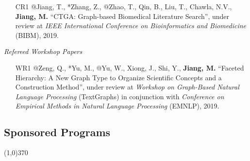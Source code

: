 \documentclass[10pt]{article}
\newenvironment{myindentpar}[1]%
{\begin{list}{}%
         {\setlength{\leftmargin}{#1}}%
         \item[]%
}
{\end{list}}
\newcounter{list}
\begin{document}
\begin{myindentpar}{0.00cm}
\begin{enumerate}[leftmargin=.5cm]
\item[CR1] @Jiang, T., *Zhang, Z., @Zhao, T., Qin, B., Liu, T., Chawla, N.V., \textbf{Jiang, M.} ``CTGA: Graph-based Biomedical Literature Search'', under review at \textit{IEEE International Conference on Bioinformatics and Biomedicine} (BIBM), 2019.

\end{enumerate}

\vspace{.2cm}\hspace{-0.25cm}\emph{Refereed Workshop Papers}

\begin{enumerate}[leftmargin=.5cm]
	
\item[WR1] @Zeng, Q., *Yu, M., @Yu, W., Xiong, J., Shi, Y., \textbf{Jiang, M.} ``Faceted Hierarchy: A New Graph Type to Organize Scientific Concepts and a Construction Method'', under review at \textit{Workshop on Graph-Based Natural Language Processing} (TextGraphs) in conjunction with \textit{Conference on Empirical Methods in Natural Language Processing} (EMNLP), 2019.
		
\end{enumerate}

\end{myindentpar}

\subsection{\sc Sponsored Programs}
\vspace{-0.4cm} \line(1,0){370} \vspace{-0.1cm}
\end{document}
